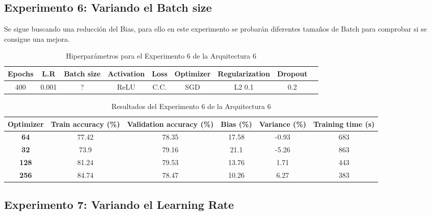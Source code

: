 \documentclass{article}
\begin{document}
   \subsection{Experimento 6: Variando el Batch size}

Se sigue buscando una reducci\'on del Bias, para ello en este experimento se probar\'an diferentes tama\~{n}os de Batch para comprobar si se consigue una mejora. 

    \begin{table}[!h]
				\begin{tabular}{|c|c|c|c|c|c|c|c|c|}
					\textbf{Epochs}&\textbf{L.R}&\textbf{Batch size}&\textbf{Activation}&\textbf{Loss}&\textbf{Optimizer}&\textbf{Regularization}&\textbf{Dropout}   \\ \hline
					400 & 0.001 & ?& ReLU & C.C. & SGD & L2 0.1 & 0.2 
				\end{tabular}
				\caption{Hiperpar\'ametros para el Experimento 6 de la Arquitectura 6}
				\label{tab:hip-a6-e2}
			\end{table}

    
   
   \begin{table}[!h]
				\begin{center}
					\begin{tabular}{ c | c | c | c | c | c |}
						 \textbf{Optimizer} & \textbf{Train accuracy (\%)} & \textbf{Validation accuracy (\%)} & \textbf{Bias (\%)} & \textbf{Variance (\%)} & \textbf{Training time (s)} \\ \hline
	
                        \textbf{64} &  77.42   &  78.35& 17.58 & -0.93 &   683  \\ \hline
                        \textbf{32} &  73.9    & 79.16& 21.1 & -5.26 &   863  \\ \hline
                        \textbf{128} &  81.24  &  79.53& 13.76 &  1.71  &   443   \\ \hline
                        \textbf{256} &  84.74 &  78.47 & 10.26 & 6.27 &   383    \\ \hline
					\end{tabular}
					\caption{Resultados del Experimento 6 de la Arquitectura 6}
					\label{tab:res-a2-e5}
				\end{center}
			\end{table}
   

    \subsection{Experimento 7: Variando el Learning Rate}
\end{document}
